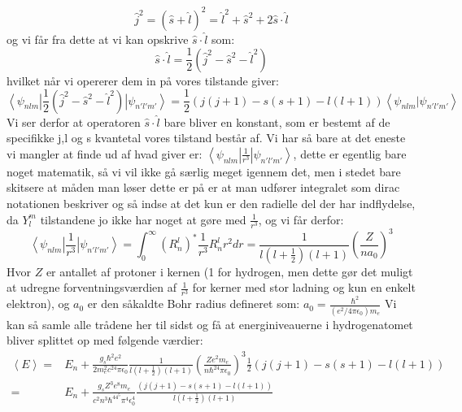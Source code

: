 \documentclass[../../Atom-ogMolekylefysik.tex]{subfiles}
\begin{document}
\begin{equation}
    \hat{j}^2=(\hat{s}+\hat{l})^2=\hat{l}^2+\hat{s}^2+2\hat{s}\cdot\hat{l}
\end{equation}
og vi får fra dette at vi kan opskrive $\hat{s}\cdot\hat{l}$ som:
\begin{equation}
    \hat{s}\cdot\hat{l}=\frac{1}{2}\left(\hat{j}^2-\hat{s}^2-\hat{l}^2\right)
\end{equation}
hvilket når vi opererer dem in på vores tilstande giver:
\begin{equation}
    \left<\psi_{nlm}\right|\frac{1}{2}\left(\hat{j}^2-\hat{s}^2-\hat{l}^2\right)\left|\psi_{n'l'm'}\right>=\frac{1}{2}\left(j(j+1)-s(s+1)-l(l+1)\right)\left<\psi_{nlm}|\psi_{n'l'm'}\right>
\end{equation}
Vi ser derfor at operatoren $\hat{s}\cdot\hat{l}$ bare bliver en konstant, som er bestemt af de specifikke j,l og s kvantetal vores tilstand består af. Vi har så bare at det eneste vi mangler at finde ud af hvad giver er: $\left<\psi_{nlm}\right|\frac{1}{r^3}\left|\psi_{n'l'm'}\right>$, dette er egentlig bare noget matematik, så vi vil ikke gå særlig meget igennem det, men i stedet bare skitsere at måden man løser dette er på er at man udfører integralet som dirac notationen beskriver  og så indse at det kun er den radielle del der har indflydelse, da $Y_l^m$ tilstandene jo ikke har noget at gøre med $\frac{1}{r^3}$, og vi får derfor:
\begin{equation}
    \left<\psi_{nlm}\right|\frac{1}{r^3}\left|\psi_{n'l'm'}\right>=\int_{0}^{\infty}(R_n^l)^{*}\frac{1}{r^3}R_n^lr^2dr=\frac{1}{l(l+\frac{1}{2})(l+1)}\left(\frac{Z}{na_0}\right)^3
\end{equation}
Hvor $Z$ er antallet af protoner i kernen (1 for hydrogen, men dette gør det muligt at udregne forventningsværdien af $\frac{1}{r^3}$ for kerner med stor ladning og kun en enkelt elektron), og $a_0$ er den såkaldte Bohr radius defineret som: $a_0=\frac{\hbar^2}{(e^2/4\pi\epsilon_0)m_e }$
Vi kan så samle alle trådene her til sidst og få at energiniveauerne i hydrogenatomet bliver splittet op med følgende værdier:
\begin{align*}
    \left<E\right>=&E_{n}+\frac{g_s\hbar^2e^2}{2m_e^2c^24\pi\epsilon_0}\frac{1}{l(l+\frac{1}{2})(l+1)}\left(\frac{Ze^2m_e}{n\hbar^24\pi\epsilon_0}\right)^3\frac{1}{2}\left(j(j+1)-s(s+1)-l(l+1)\right)\\
    =&E_{n}+
    \frac{g_sZ^3e^8m_e}{c^2n^3\hbar^44^5\pi^4\epsilon_0^4}
    \frac{\left(j(j+1)-s(s+1)-l(l+1)\right)}{l(l+\frac{1}{2})(l+1)}
\end{align*}
\end{document}
